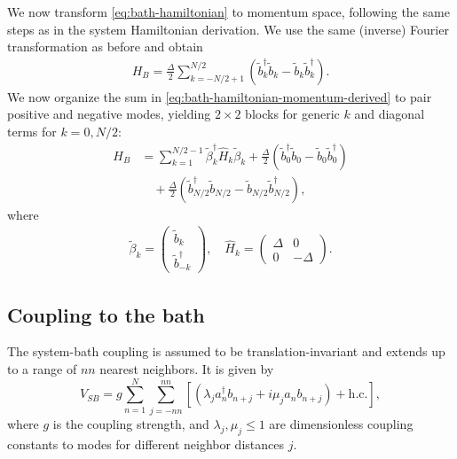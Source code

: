 We now transform \cref{eq:bath-hamiltonian} to momentum space, following the same steps as in the system Hamiltonian derivation. We use the same (inverse) Fourier transformation as before and obtain
\begin{align}
    H_B = \frac{\Delta}{2}
    \sum_{k=-N/2+1}^{N/2}
    (\tilde{b}_k^\dagger \tilde{b}_k -\tilde{b}_k \tilde{b}_k^\dagger).
    \label{eq:bath-hamiltonian-momentum-derived}
\end{align}
We now organize the sum in \cref{eq:bath-hamiltonian-momentum-derived} to pair positive and negative modes, yielding $2\times 2$ blocks for generic $k$ and diagonal terms for $k=0, N/2$:
\begin{align}
    H_B
     &=
    \sum_{k=1}^{N/2-1}
    \tilde{\beta}_k^\dagger \hat{H}_k \tilde{\beta}_k+
    \frac{\Delta}{2}
    (\tilde{b}_0^\dagger \tilde{b}_0 - \tilde{b}_0 \tilde{b}_0^\dagger)\nonumber\\
     &\quad  +
    \frac{\Delta}{2}
    (\tilde{b}_{N/2}^\dagger \tilde{b}_{N/2} - \tilde{b}_{N/2} \tilde{b}_{N/2}^\dagger),
\end{align}
where
\begin{align}
    \tilde{\beta}_k = \begin{pmatrix}
                          \tilde{b}_k\\
                          \tilde{b}_{-k}^\dagger
                      \end{pmatrix}, \quad
    \hat{H}_k = \begin{pmatrix}
                    \Delta &0\\
                    0      &-\Delta
                \end{pmatrix}.
\end{align}


\subsection{Coupling to the bath}

The system-bath coupling is assumed to be translation-invariant and extends up to a range of $nn$ nearest neighbors. It is given by
\begin{equation}
    {V}_{SB} = g \sum_{n=1}^N \sum_{j=-nn}^{nn} \left[\left(\lambda_j a_n^\dag {b}_{n+j} + i \mu_j a_n {b}_{n+j}\right) + \text{h.c.}\right],
    \label{eq:system-bath-coupling}
\end{equation}
where $g$ is the coupling strength, and $\lambda_j,\mu_j\le 1$ are dimensionless coupling constants to modes for different neighbor distances $j$.

